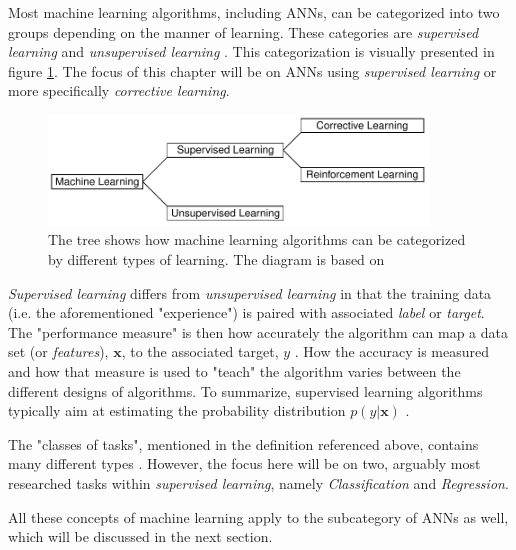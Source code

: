 Most machine learning algorithms, including \acp{ANN}, can be categorized into two groups depending on the manner of learning.
These categories are \textit{supervised learning} and \textit{unsupervised learning} \cite{Goodfellow2016}.
This categorization is visually presented in figure \ref{fig:types-of-learning}.
The focus of this chapter will be on \acp{ANN} using \textit{supervised learning} or more specifically \textit{corrective learning}.

\begin{figure}[ht]
    \centering
    \includegraphics[width=0.9\textwidth]{img/types-of-learning-diagram.pdf}
    \caption{The tree shows how machine learning algorithms can be categorized by different types of learning. The diagram is based on \cite[Fig. 4.3]{Rojas1996a}}
    \label{fig:types-of-learning}
\end{figure}

\textit{Supervised learning} differs from \textit{unsupervised learning} in that the training data (i.e. the aforementioned "experience") is paired with associated \textit{label} or \textit{target}.
The "performance measure" is then how accurately the algorithm can map a data set (or \textit{features}), $\mathbf{x}$, to the associated target, $y$ \cite{Goodfellow2016}.
How the accuracy is measured and how that measure is used to "teach" the algorithm varies between the different designs of algorithms.
To summarize, supervised learning algorithms typically aim at estimating the probability distribution $p(y | \mathbf{x})$ \cite{Goodfellow2016}.

The "classes of tasks", mentioned in the definition referenced above, contains many different types \cite{Goodfellow2016}.
However, the focus here will be on two, arguably most researched tasks within \textit{supervised learning}, namely \textit{Classification} and \textit{Regression}.

All these concepts of machine learning apply to the subcategory of \acp{ANN} as well, which will be discussed in the next section.


